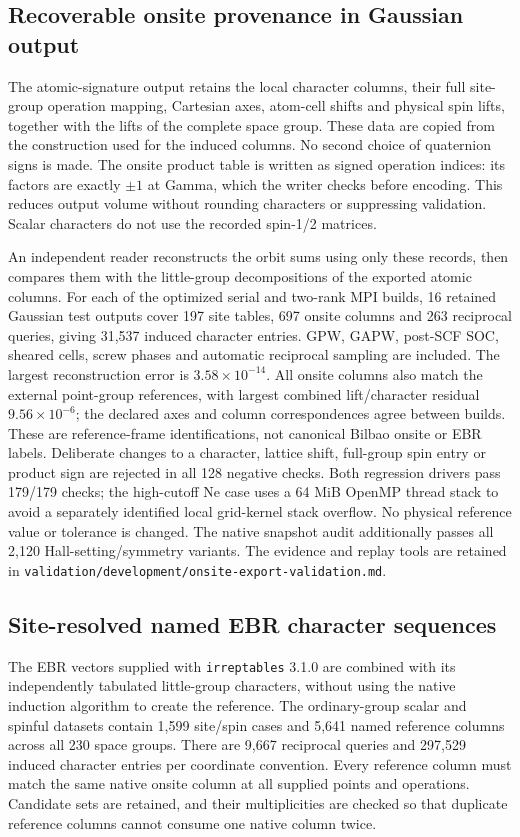 \documentclass[11pt]{article}
\begin{document}
\subsection{Recoverable onsite provenance in Gaussian output}
The atomic-signature output retains the local character columns,
their full site-group operation mapping, Cartesian axes, atom-cell
shifts and physical spin lifts, together with the lifts of the
complete space group. These data are copied from the construction
used for the induced columns. No second choice of quaternion signs
is made. The onsite product table is written as signed operation
indices: its factors are exactly $\pm1$ at Gamma, which the writer
checks before encoding. This reduces output volume without rounding
characters or suppressing validation. Scalar characters do not use
the recorded spin-1/2 matrices.

An independent reader reconstructs the orbit sums using only these
records, then compares them with the little-group decompositions of
the exported atomic columns. For each of the optimized serial and
two-rank MPI builds, 16 retained Gaussian test outputs cover 197 site
tables, 697 onsite columns and 263 reciprocal queries, giving 31,537
induced character entries. GPW, GAPW, post-SCF SOC, sheared cells,
screw phases and automatic reciprocal sampling are included. The
largest reconstruction error is $3.58\times10^{-14}$. All onsite
columns also match the external point-group references, with
largest combined lift/character residual $9.56\times10^{-6}$; the
declared axes and column correspondences agree between builds.
These are reference-frame identifications, not canonical Bilbao
onsite or EBR labels. Deliberate changes to a character, lattice
shift, full-group spin entry or product sign are rejected in all
128 negative checks. Both regression drivers pass 179/179 checks;
the high-cutoff Ne case uses a 64 MiB OpenMP thread stack to avoid
a separately identified local grid-kernel stack overflow.
No physical reference value or tolerance is changed. The native
snapshot audit additionally passes all 2,120 Hall-setting/symmetry
variants. The evidence and replay tools are retained in
\texttt{validation/development/onsite-export-validation.md}.

\subsection{Site-resolved named EBR character sequences}
The EBR vectors supplied with \texttt{irreptables} 3.1.0 are combined
with its independently tabulated little-group characters, without
using the native induction algorithm to create the reference.
The ordinary-group scalar and spinful datasets contain 1,599
site/spin cases and 5,641 named reference columns across all 230
space groups. There are 9,667 reciprocal queries and 297,529 induced
character entries per coordinate convention. Every reference column
must match the same native onsite column at all supplied points and
operations. Candidate sets are retained, and their multiplicities
are checked so that duplicate reference columns cannot consume one
native column twice.
\end{document}
